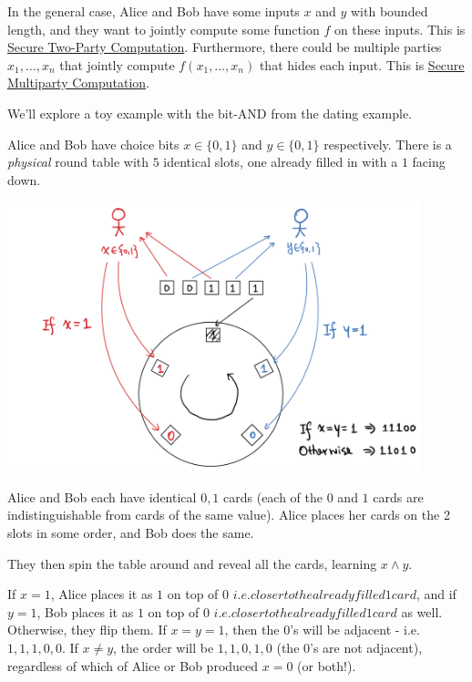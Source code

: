 In the general case, Alice and Bob have some inputs $x$ and $y$ with bounded length, and they want to jointly compute some function $f$ on these inputs. This is \ul{Secure Two-Party Computation}. Furthermore, there could be multiple parties $x_1, \dots, x_n$ that jointly compute $f(x_1, \dots, x_n)$ that hides each input. This is \ul{Secure Multiparty Computation}.

We'll explore a toy example with the bit-\textsf{AND} from the dating example.

\begin{example*}
    Alice and Bob have choice bits $x\in\{0, 1\}$ and $y\in\{0, 1\}$ respectively. There is a \emph{physical} round table with $5$ identical slots, one already filled in with a $1$ facing down.

    \begin{center}
        \includegraphics[width=0.9\textwidth]{images/2023-01-26/private_dating.png}
    \end{center}

    Alice and Bob each have identical $0, 1$ cards (each of the $0$ and $1$ cards are indistinguishable from cards of the same value). Alice places her cards on the 2 slots in some order, and Bob does the same.

    They then spin the table around and reveal all the cards, learning $x\land y$.

    If $x = 1$, Alice places it as $1$ on top of $0$ \(i.e. closer to the already filled 1 card\), and if $y = 1$, Bob places it as $1$ on top of $0$ \(i.e. closer to the already filled 1 card\) as well. Otherwise, they flip them. If $x = y = 1$, then the $0$'s will be adjacent - i.e. $1,1,1,0,0$. If $x \neq y$, the order will be $1,1,0,1,0$ (the $0$'s are not adjacent), regardless of which of Alice or Bob produced $x = 0$ (or both!).
\end{example*}

